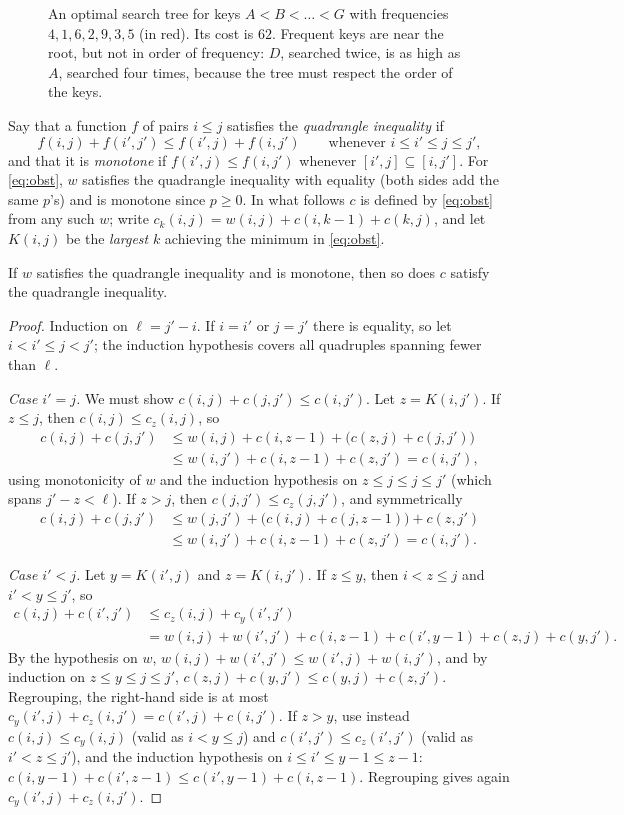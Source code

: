 \begin{figure}[ht]
\centering
{}
\caption{An optimal search tree for keys $A<B<\dots<G$ with frequencies $4,1,6,2,9,3,5$ (in red). Its cost is $62$. Frequent keys are near the root, but not in order of frequency: $D$, searched twice, is as high as
$A$, searched four times, because the tree must respect the order of the keys.}
\label{fig:obst}
\end{figure}

Say that a function $f$ of pairs $i\le j$ satisfies the \emph{quadrangle inequality} if
\[
f(i,j)+f(i',j')\le f(i',j)+f(i,j')\qquad\text{whenever } i\le i'\le j\le j',
\]
and that it is \emph{monotone} if $f(i',j)\le f(i,j')$ whenever $[i',j]\subseteq[i,j']$. For \eqref{eq:obst}, $w$ satisfies the quadrangle inequality with equality (both sides add the same $p$'s) and is monotone since $p\ge0$.
In what follows $c$ is defined by \eqref{eq:obst} from any such $w$; write $c_k(i,j)=w(i,j)+c(i,k-1)+c(k,j)$, and let $K(i,j)$ be the \emph{largest} $k$ achieving the minimum in \eqref{eq:obst}.

\begin{lemma}[Yao, 1980]\label{lem:yaoqi}
If $w$ satisfies the quadrangle inequality and is monotone, then so does $c$ satisfy the quadrangle inequality.
\end{lemma}
\begin{proof}
Induction on $\ell=j'-i$. If $i=i'$ or $j=j'$ there is equality, so let $i<i'\le j<j'$; the induction hypothesis covers all quadruples spanning fewer than $\ell$.

\emph{Case $i'=j$.} We must show $c(i,j)+c(j,j')\le c(i,j')$. Let $z=K(i,j')$. If $z\le j$, then $c(i,j)\le c_z(i,j)$, so
\[\begin{aligned}
c(i,j)+c(j,j')&\le w(i,j)+c(i,z-1)+\big(c(z,j)+c(j,j')\big)\\
&\le w(i,j')+c(i,z-1)+c(z,j')=c(i,j'),
\end{aligned}\]
using monotonicity of $w$ and the induction hypothesis on $z\le j\le j\le j'$ (which spans $j'-z<\ell$). If $z>j$, then $c(j,j')\le c_z(j,j')$, and symmetrically
\[\begin{aligned}
c(i,j)+c(j,j')&\le w(j,j')+\big(c(i,j)+c(j,z-1)\big)+c(z,j')\\
&\le w(i,j')+c(i,z-1)+c(z,j')=c(i,j').
\end{aligned}\]

\emph{Case $i'<j$.} Let $y=K(i',j)$ and $z=K(i,j')$. If $z\le y$, then $i<z\le j$ and $i'<y\le j'$, so
\[\begin{aligned}
c(i,j)+c(i',j')&\le c_z(i,j)+c_y(i',j')\\
&=w(i,j)+w(i',j')+c(i,z-1)+c(i',y-1)+c(z,j)+c(y,j').
\end{aligned}\]
By the hypothesis on $w$, $w(i,j)+w(i',j')\le w(i',j)+w(i,j')$, and by induction on $z\le y\le j\le j'$, $c(z,j)+c(y,j')\le c(y,j)+c(z,j')$. Regrouping, the right-hand side is at most
$c_y(i',j)+c_z(i,j')=c(i',j)+c(i,j')$. If $z>y$, use instead $c(i,j)\le c_y(i,j)$ (valid as $i<y\le j$) and $c(i',j')\le c_z(i',j')$ (valid as $i'<z\le j'$), and the induction hypothesis on
$i\le i'\le y-1\le z-1$: $c(i,y-1)+c(i',z-1)\le c(i',y-1)+c(i,z-1)$. Regrouping gives again $c_y(i',j)+c_z(i,j')$.
\end{proof}

